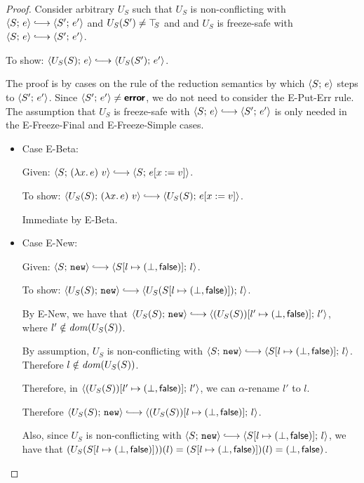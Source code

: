 \begin{proof}
  Consider arbitrary $U_S$ such that $U_S$ is non-conflicting with
  $\config{S}{e} \parstepsto \config{S'}{e'}$ and $U_S(S') \neq \top\hspace{-0.85mm}_{S}$
  and and $U_S$ is freeze-safe with $\config{S}{e} \parstepsto
  \config{S'}{e'}$.

  To show: $\config{U_S(S)}{e} \parstepsto \config{U_S(S')}{e'}$.

  The proof is by cases on the rule of the reduction semantics by
  which $\langle S;\, e \rangle$ steps to $\langle S';\, e' \rangle$.  Since
  $\langle S';\, e' \rangle \neq \textbf{\textsf{error}}$, we do not need to consider the {\sc
    E-Put-Err} rule.  The assumption that $U_S$ is freeze-safe with
  $\config{S}{e} \parstepsto \config{S'}{e'}$ is only needed in the
  {\sc E-Freeze-Final} and {\sc E-Freeze-Simple} cases.

  \begin{itemize}

    \item Case {\sc E-Beta}:

      Given: $\config{S}{\app{(\lam{x}{e})}{v}} \parstepsto
      \config{S}{\subst{e}{x}{v}}$.

      To show: $\config{U_S(S)}{\app{(\lam{x}{e})}{v}} \parstepsto
      \config{U_S(S)}{\subst{e}{x}{v}}$.

      Immediate by {\sc E-Beta}.

    \item Case {\sc E-New}:

      Given: $\config{S}{\NEW} \parstepsto
      \config{\extS{S}{l}{\bot}{\frozenfalse}}{l}$.

      To show: $\config{U_S(S)}{\NEW} \parstepsto
      \config{U_S(\extS{S}{l}{\bot}{\frozenfalse})}{l}$.

      By {\sc E-New}, we have that $\config{U_S(S)}{\NEW} \parstepsto
      \config{\extS{(U_S(S))}{l'}{\bot}{\frozenfalse}}{l'}$, where $l'
      \notin \mathit{dom}(U_S(S))$.

      By assumption, $U_S$ is non-conflicting with $\config{S}{\NEW}
      \parstepsto \config{\extS{S}{l}{\bot}{\frozenfalse}}{l}$.
      Therefore $l \notin \mathit{dom}(U_S(S))$.

      Therefore, in
      $\langle (U_S(S))[l' \mapsto (\bot, \textsf{false})];\, l' \rangle$, we
      can $\alpha$-rename $l'$ to $l$.

      Therefore $\config{U_S(S)}{\NEW} \parstepsto
      \config{\extS{(U_S(S))}{l}{\bot}{\frozenfalse}}{l}$.

      Also, since $U_S$ is non-conflicting with $\config{S}{\NEW}
      \parstepsto \config{\extS{S}{l}{\bot}{\frozenfalse}}{l}$, we
      have that $(U_S(S[l \mapsto (\bot, \textsf{false})]))(l) =
      (S[l \mapsto (\bot, \textsf{false})])(l) =
      (\bot, \textsf{false})$.


\end{itemize}
\end{proof}
